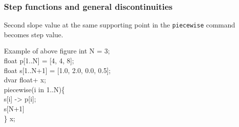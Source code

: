 \begin{frame}
 \frametitle{Step functions and general discontinuities}
 Second slope value at the same supporting point in the \texttt{piecewise} command becomes step value.
 \begin{block}{Example of above figure}\ttfamily\footnotesize
  int N = 3;\\
  float p[1..N] = [4, \alert{4}, 8];\\
  float s[1..N+1] = [1.0, \alert{2.0}, 0.0, 0.5];\\
  dvar float+ x;\\[2ex]  
  piecewise(i in 1..N)\{\\
    \quad s[i] -> p[i];\\
    \quad s[N+1]\\
  \} x;\\
 \end{block}
\end{frame}
